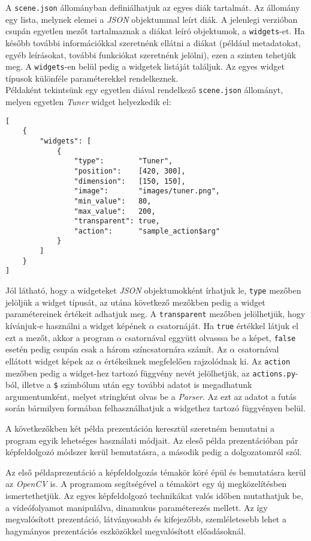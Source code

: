 A \texttt{scene.json} állományban definiálhatjuk az egyes diák tartalmát. Az állomány egy lista, melynek elemei a \textit{JSON} objektummal leírt diák. A jelenlegi verzióban csupán egyetlen mezőt tartalmaznak a diákat leíró objektumok, a \texttt{widgets}-et. Ha később további információkkal szeretnénk ellátni a diákat (például metadatokat, egyéb leírásokat, további funkciókat szeretnénk jelölni), ezen a szinten tehetjük meg. A \texttt{widgets}-en belül pedig a widgetek listáját találjuk. Az egyes widget típusok különféle paraméterekkel rendelkeznek.\\
Példaként tekintsünk egy egyetlen diával rendelkező \texttt{scene.json} állományt, melyen egyetlen \textit{Tuner} widget helyezkedik el:
\begin{verbatim}
[
    {
        "widgets": [
            {
                "type":        "Tuner",
                "position":    [420, 300],
                "dimension":   [150, 150],
                "image":       "images/tuner.png",
                "min_value":   80,
                "max_value":   200,
                "transparent": true,
                "action":      "sample_action$arg"
            }
        ]
    }
]
\end{verbatim}
Jól látható, hogy a widgeteket \textit{JSON} objektumokként írhatjuk le, \texttt{type} mezőben jelöljük a widget típusát, az utána következő mezőkben pedig a widget paramétereinek értékeit adhatjuk meg. A \texttt{transparent} mezőben jelölhetjük, hogy kívánjuk-e használni a widget képének $\alpha$ csatornáját. Ha \texttt{true} értékkel látjuk el ezt a mezőt, akkor a program $\alpha$ csatornával eggyütt olvasssa be a képet, \texttt{false} esetén pedig csupán csak a három színcsatornára számít. Az $\alpha$ csatornával ellátott widget képek az $\alpha$ értékeiknek megfelelően rajzolódnak ki.
Az \texttt{action} mezőben pedig a widget-hez tartozó függvény nevét jelölhetjük, az \texttt{actions.py}-ból, illetve a \texttt{\$} szimbólum után egy további adatot is megadhatunk argumentumként, melyet stringként olvas be a \textit{Parser}. Az ezt az adatot a futás során bármilyen formában felhasználhatjuk a widgethez tartozó függvényen belül.

A következőkben két példa prezentáción keresztül szeretném bemutatni a program egyik lehetséges használati módjait. Az eleső példa prezentációban pár képfeldolgozó módszer kerül bemutatásra, a második pedig a dolgozatomról szól.


Az első példaprezentáció a képfeldolgozás témakör köré épül és bemutatásra kerül az \textit{OpenCV} is. A programom segítségével a témakört egy új megközelítésben ismertethetjük. Az egyes képfeldolgozó technikákat valós időben mutathatjuk be, a videófolyamot manipulálva, dinamukus paraméterezés mellett. Az így megvalósított prezentáció, látványosabb és kifejezőbb, szemléletesebb lehet a hagymányos prezentációs eszközökkel megvalósított előadásoknál.

